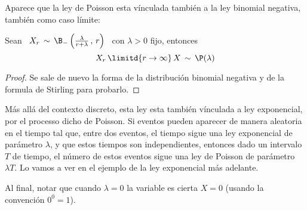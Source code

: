 Aparece  que la  ley de  Poisson esta  v\'inculada tambi\'en  a la  ley binomial
negativa, tambi\'en como caso l\'imite:
%
\begin{lema}
\label{Lem:MP:VinvuloPoissonBinomialNegativa}
%
Sean \ $X_r \, \sim \, \B_-\left( \frac{\lambda}{r+\lambda} \, , \, r \right)$ \
con $\lambda > 0$ fijo, entonces
  \[
  X_r \, \limitd{r \to \infty} \, X \, \sim \, \P(\lambda)
  \]
\end{lema}
\begin{proof}
  Se  sale de nuevo  la forma  de la  distribuci\'on binomial  negativa y  de la
  formula de Stirling para probarlo.
\end{proof}

M\'as all\'a  del contexto discreto, esta  ley esta tambi\'en  v\'inculada a ley
exponencial, por  el processo dicho de  Poisson.  Si eventos  pueden aparecer de
manera aleatoria  en el tiempo tal que,  entre dos eventos, el  tiempo sigue una
ley   exponencial  de   par\'ametro   $\lambda$,  y   que   estos  tiempos   son
independientes, entonces dado  un intervalo $T$ de tiempo,  el n\'umero de estos
eventos sigue una ley de Poisson de  par\'ametro $\lambda T$.  Lo vamos a ver en
el ejemplo de la ley exponencial m\'as adelante.

Al final, notar que  cuando $\lambda = 0$ la variable es  cierta $X = 0$ (usando
la convenci\'on $0^0 = 1$).
